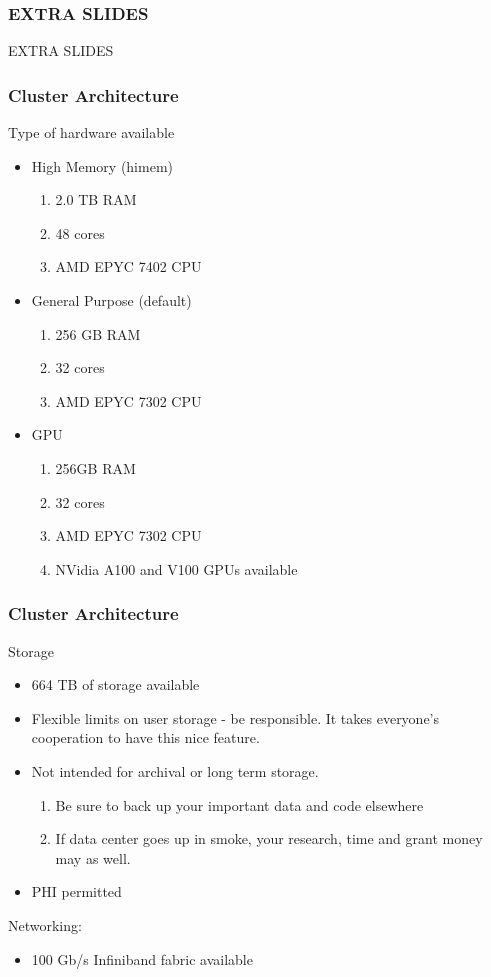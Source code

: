 \documentclass{beamer}
\begin{document}
\begin{frame}
\frametitle{EXTRA SLIDES}
\large EXTRA SLIDES
\end{frame}

\begin{frame}
\frametitle{Cluster Architecture}
Type of hardware available
\begin{itemize}
    \item High Memory (himem)
    \begin{enumerate}
        \item 2.0 TB RAM
        \item 48 cores 
        \item AMD EPYC 7402 CPU
    \end{enumerate}
    \bigskip
    \pause
    \item General Purpose (default)
    \begin{enumerate}
        \item 256 GB RAM
        \item 32 cores 
        \item AMD EPYC 7302 CPU
    \end{enumerate}
    \bigskip
    \pause
    \item GPU 
    \begin{enumerate}
        \item 256GB RAM 
        \item 32 cores 
        \item AMD EPYC 7302 CPU
        \item NVidia A100 and V100 GPUs available
    \end{enumerate}
\end{itemize}
\end{frame}


\begin{frame}
\frametitle{Cluster Architecture}
Storage 
\begin{itemize}
    \item 664 TB of storage available
    \pause
    \item Flexible limits on user storage - be responsible.
          It takes everyone's cooperation to have this nice feature.
    \pause
    \item Not intended for archival or long term storage.
        \begin{enumerate}
              \item Be sure to back up your important data and code elsewhere
              \pause
              \item If data center goes up in smoke, your research, time and grant money may as well.
        \end{enumerate}
    \pause
    \item PHI permitted
\end{itemize}
\pause
Networking:
\begin{itemize}
    \item 100 Gb/s Infiniband fabric available
\end{itemize}
\end{frame}
\end{document}
